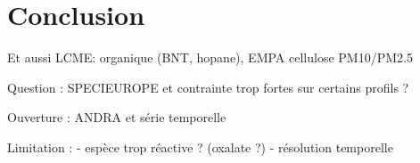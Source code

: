 %
% 


\section{Conclusion}%
\label{sec:conclusion}

Et aussi LCME: organique (BNT, hopane), EMPA cellulose PM10/PM2.5

Question : SPECIEUROPE et contrainte trop fortes sur certains profils ?

Ouverture : ANDRA et série temporelle

Limitation : 
- espèce trop réactive ? (oxalate ?)
- résolution temporelle



